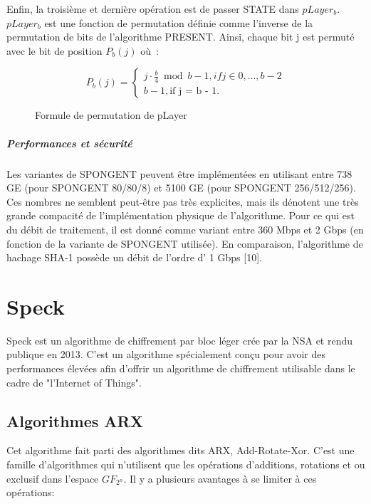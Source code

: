 		Enfin, la troisième et dernière opération est de passer STATE dans $pLayer_{b}$.
		$pLayer_{b}$ est une fonction de permutation définie comme l’inverse de la permutation de bits de l’algorithme PRESENT.
		Ainsi, chaque bit j est permuté avec le bit de position $P_{b}(j)$ où :

		\begin{figure}[htbp]
			\centering
		\begin{equation}
			P_{b}(j) = \begin{cases}
			  j \cdot \frac{b}{4} \bmod b - 1, if j \in {0, \dots, b - 2}\\
			  b - 1, \text{if j = b - 1}.
			\end{cases}
		  \end{equation}
		  \caption{Formule de permutation de pLayer}
			\label{pLayer}
		\end{figure}

		\subparagraph{Performances et sécurité}

		Les variantes de SPONGENT peuvent être implémentées en utilisant entre 738 GE (pour SPONGENT 80/80/8) et 5100 GE (pour SPONGENT 256/512/256).
		Ces nombres ne semblent peut-être pas très explicites, mais ils dénotent une très grande compacité de l’implémentation physique de l’algorithme.
		Pour ce qui est du débit de traitement, il est donné comme variant entre 360 Mbps et 2 Gbps (en fonction de la variante de SPONGENT utilisée).
		En comparaison, l’algorithme de hachage SHA-1 possède un débit de l’ordre d’ 1 Gbps [10].


		\section{Speck}

			Speck est un algorithme de chiffrement par bloc léger crée par la NSA et rendu
		publique en 2013. C'est un algorithme spécialement conçu pour avoir des performances
		élevées afin d'offrir un algorithme de chiffrement utilisable dans le cadre de
		"l'Internet of Things".

		\subsection{Algorithmes ARX}

				Cet algorithme fait parti des algorithmes dits ARX, Add-Rotate-Xor. C'est une famille
			d'algorithmes qui n'utilisent que les opérations d'additions, rotations et ou exclusif
			dans l'espace $GF_{2^n}$. Il y a plusieurs avantages à se limiter à ces opérations:

